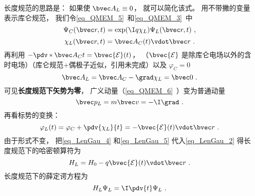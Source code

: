 长度规范的思路是： 如果使 $\bvec A_L \equiv 0$， 就可以简化该式。 用不带撇的变量表示库仑规范， 我们令\autoref{eq_QMEM_5}~和\autoref{eq_QMEM_3}~中
\begin{equation}\label{eq_LenGau_1}
\Psi_C(\bvec r, t) = \exp(\I q\chi_L)\Psi_L(\bvec r, t)~,
\end{equation}
\begin{equation}
\chi_L(\bvec r, t) = \bvec A_C(t) \vdot \bvec r~.
\end{equation}
再利用 $-\pdv*{\bvec A_C}{t} = \bvec {\mathcal E}(t)$， （$\bvec {\mathcal E}$ 是除库仑电场以外的含时电场）（库仑规范+偶极子近似，引用未完成）以及 $\varphi_C = 0$
\begin{equation}\label{eq_LenGau_4}
\bvec A_L = \bvec A_C - \grad \chi_L = \bvec 0~.
\end{equation}
可见\textbf{长度规范下矢势为零}， 广义动量（\autoref{eq_QMEM_6}~）变为普通动量
\begin{equation}\label{eq_LenGau_6}
\bvec p_L = m \bvec v = -\I \grad~.
\end{equation}
再看标势的变换：
\begin{equation}\label{eq_LenGau_5}
\varphi_L(t) = \varphi_C + \pdv{\chi_L}{t} = -\bvec {\mathcal E}(t) \vdot \bvec r~.
\end{equation}
由于形式不变， 把\autoref{eq_LenGau_4} 和\autoref{eq_LenGau_5} 代入\autoref{eq_LenGau_2} 得长度规范下的哈密顿算符为
\begin{equation}\label{eq_LenGau_7}
H_L = H_0 - q\bvec{\mathcal{E}}(t) \vdot \bvec r~.
\end{equation}
长度规范下的薛定谔方程为
\begin{equation}\label{eq_LenGau_3}
H_L \Psi_L = \I \pdv{t} \Psi_L~.
\end{equation}
